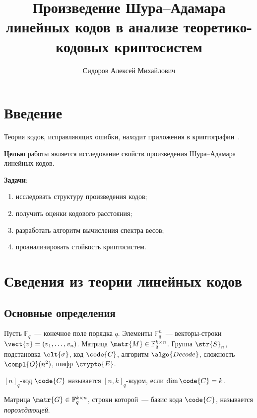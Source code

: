 \documentclass[font=modern]{cmcmsuthesis-phd}
\author{Сидоров Алексей Михайлович}
\title{Произведение Шура--Адамара линейных кодов
       в анализе теоретико-кодовых криптосистем}
\begin{document}
\maketitle
\tableofcontents

\chapter*{Введение}

Теория кодов, исправляющих ошибки, находит приложения
в криптографии~\cite{shannon1948,macwilliams1979}.

\textbf{Целью} работы является исследование свойств произведения
Шура--Адамара линейных кодов.

\textbf{Задачи}:
\begin{enumerate}[beginpenalty=10000]
    \item исследовать структуру произведения кодов;
    \item получить оценки кодового расстояния;
    \item разработать алгоритм вычисления спектра весов;
    \item проанализировать стойкость криптосистем.
\end{enumerate}

\chapter{Сведения из теории линейных кодов}\label{ch:codes}

\section{Основные определения}

Пусть $\mathbb{F}_q$~--- конечное поле порядка $q$.
Элементы $\mathbb{F}^n_q$~--- векторы-строки
$\vect{v}=(v_1,\dotsc,v_n)$.
Матрица $\matr{M}\in\mathbb{F}^{k\times n}_q$.
Группа $\str{S}_n$, подстановка $\elt{\sigma}$, код $\code{C}$,
алгоритм $\algo{Decode}$, сложность $\compl{O}(n^2)$,
шифр $\crypto{E}$.

\begin{definition}\label{def:nkcode}
$[n]_q$-код $\code{C}$ называется $[n,k]_q$-кодом, если
$\dim\code{C}=k$.
\end{definition}

\begin{definition}\label{def:generator}
Матрица $\matr{G}\in\mathbb{F}^{k\times n}_q$, строки которой~---
базис кода $\code{C}$, называется \emph{порождающей}.
\end{definition}
\end{document}
